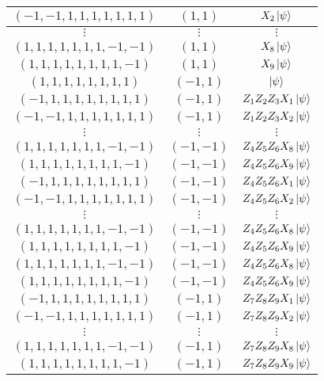 \documentclass[12pt]{article}
\theoremstyle{plain}
\theoremstyle{definition}
\begin{document}
\begin{algorithm}
\begin{center}
\begin{tabular}{|c|c|c|}
			\hline
			$(-1,-1,1,1,1,1,1,1,1)$ & $(1,1)$ & $X_2\ket{\psi}$\\
			\hline
			$\vdots$ & $\vdots$ & $\vdots$\\
			\hline
			$(1,1,1,1,1,1,1,-1,-1)$ & $(1,1)$ & $X_8\ket{\psi}$\\
			\hline
			$(1,1,1,1,1,1,1,1,-1)$ & $(1,1)$ & $X_9\ket{\psi}$\\
			\hline
			$(1,1,1,1,1,1,1,1)$ & $(-1,1)$ & $\ket{\psi}$\\
			\hline
			$(-1,1,1,1,1,1,1,1,1)$ & $(-1,1)$ & $Z_1Z_2Z_3X_1\ket{\psi}$\\
			\hline
			$(-1,-1,1,1,1,1,1,1,1)$ & $(-1,1)$ & $Z_1Z_2Z_3X_2\ket{\psi}$\\
			\hline
			$\vdots$ & $\vdots$ & $\vdots$\\
			\hline
			$(1,1,1,1,1,1,1,-1,-1)$ & $(-1,-1)$ & $Z_4Z_5Z_6X_8\ket{\psi}$\\
			\hline
			$(1,1,1,1,1,1,1,1,-1)$ & $(-1,-1)$ & $Z_4Z_5Z_6X_9\ket{\psi}$\\
			\hline
			$(-1,1,1,1,1,1,1,1,1)$ & $(-1,-1)$ & $Z_4Z_5Z_6X_1\ket{\psi}$\\
			\hline
			$(-1,-1,1,1,1,1,1,1,1)$ & $(-1,-1)$ & $Z_4Z_5Z_6X_2\ket{\psi}$\\
			\hline
			$\vdots$ & $\vdots$ & $\vdots$\\
			\hline
			$(1,1,1,1,1,1,1,-1,-1)$ & $(-1,-1)$ & $Z_4Z_5Z_6X_8\ket{\psi}$\\
			\hline
			$(1,1,1,1,1,1,1,1,-1)$ & $(-1,-1)$ & $Z_4Z_5Z_6X_9\ket{\psi}$\\
			\hline
			$(1,1,1,1,1,1,1,-1,-1)$ & $(-1,-1)$ & $Z_4Z_5Z_6X_8\ket{\psi}$\\
			\hline
			$(1,1,1,1,1,1,1,1,-1)$ & $(-1,-1)$ & $Z_4Z_5Z_6X_9\ket{\psi}$\\
			\hline
			$(-1,1,1,1,1,1,1,1,1)$ & $(-1,1)$ & $Z_7Z_8Z_9X_1\ket{\psi}$\\
			\hline
			$(-1,-1,1,1,1,1,1,1,1)$ & $(-1,1)$ & $Z_7Z_8Z_9X_2\ket{\psi}$\\
			\hline
			$\vdots$ & $\vdots$ & $\vdots$\\
			\hline
			$(1,1,1,1,1,1,1,-1,-1)$ & $(-1,1)$ & $Z_7Z_8Z_9X_8\ket{\psi}$\\
			\hline
			$(1,1,1,1,1,1,1,1,-1)$ & $(-1,1)$ & $Z_7Z_8Z_9X_9\ket{\psi}$\\
			\hline
		\end{tabular}
	\end{center}
\end{algorithm}
\end{document}
